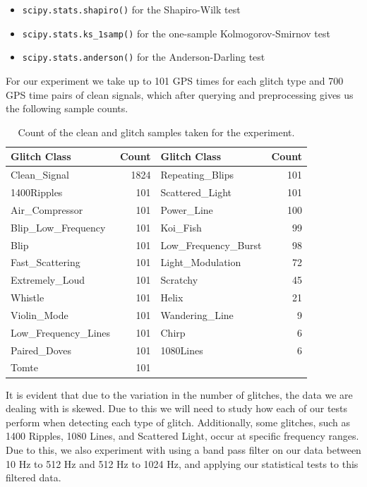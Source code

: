 \documentclass[12pt]{article}
\begin{document}
\begin{itemize}
  \item \texttt{scipy.stats.shapiro()} for the Shapiro-Wilk test
  \item \texttt{scipy.stats.ks\_1samp()} for the one-sample Kolmogorov-Smirnov test
  \item \texttt{scipy.stats.anderson()} for the Anderson-Darling test
\end{itemize}

\medskip
\noindent For our experiment we take up to 101 GPS times for each glitch type and 700 GPS time pairs of clean signals, which after querying and preprocessing gives us the following sample counts.

\begin{table}[H]
  \centering
  \begin{tabular}{lr|lr}
    \toprule
    Glitch Class & Count & Glitch Class & Count \\
    \midrule
    Clean\_Signal & 1824 & Repeating\_Blips & 101 \\
    1400Ripples & 101 & Scattered\_Light & 101 \\
    Air\_Compressor & 101 & Power\_Line & 100 \\
    Blip\_Low\_Frequency & 101 & Koi\_Fish & 99 \\
    Blip & 101 & Low\_Frequency\_Burst & 98 \\
    Fast\_Scattering & 101 & Light\_Modulation & 72 \\
    Extremely\_Loud & 101 & Scratchy & 45 \\
    Whistle & 101 & Helix & 21 \\
    Violin\_Mode & 101 & Wandering\_Line & 9 \\
    Low\_Frequency\_Lines & 101 & Chirp & 6 \\
    Paired\_Doves & 101 & 1080Lines & 6 \\
    Tomte & 101 \\
    \bottomrule
  \end{tabular}
  \caption{Count of the clean and glitch samples taken for the experiment.}
  \label{tab:label_counts}
\end{table}

\noindent It is evident that due to the variation in the number of glitches, the data we are dealing with is skewed. Due to this we will need to study how each of our tests perform when detecting each type of glitch. Additionally, some glitches, such as 1400 Ripples, 1080 Lines, and Scattered Light, occur at specific frequency ranges. Due to this, we also experiment with using a band pass filter on our data between 10 Hz to 512 Hz and 512 Hz to 1024 Hz, and applying our statistical tests to this filtered data.
\end{document}
